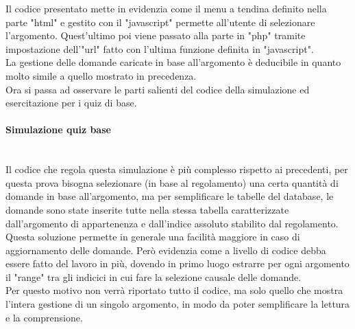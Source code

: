 Il codice presentato mette in evidenzia come il menu a tendina definito nella parte "html" e gestito con il "javascript" permette all'utente di selezionare l'argomento. Quest'ultimo poi viene passato alla parte in "php" tramite impostazione dell'"url" fatto con l'ultima funzione definita in "javascript".\\
La gestione delle domande caricate in base all'argomento è deducibile in quanto molto simile a quello mostrato in precedenza.\\

Ora si passa ad osservare le parti salienti del codice della simulazione ed esercitazione per i quiz di base.\\

\paragraph{Simulazione quiz base}\leavevmode\\
Il codice che regola questa simulazione è più complesso rispetto ai precedenti, per questa prova bisogna selezionare (in base al regolamento) una certa quantità di domande in base all'argomento, ma per semplificare le tabelle del database, le domande sono state inserite tutte nella stessa tabella caratterizzate dall'argomento di appartenenza e dall'indice assoluto stabilito dal regolamento. Questa soluzione permette in generale una facilità maggiore in caso di aggiornamento delle domande.
Però evidenzia come a livello di codice debba essere fatto del lavoro in più, dovendo in primo luogo estrarre per ogni argomento il "range" tra gli indicici in cui fare la selezione causale delle domande.\\
Per questo motivo non verrà riportato tutto il codice, ma solo quello che mostra l'intera gestione di un singolo argomento, in modo da poter semplificare la lettura e la comprensione.\\

